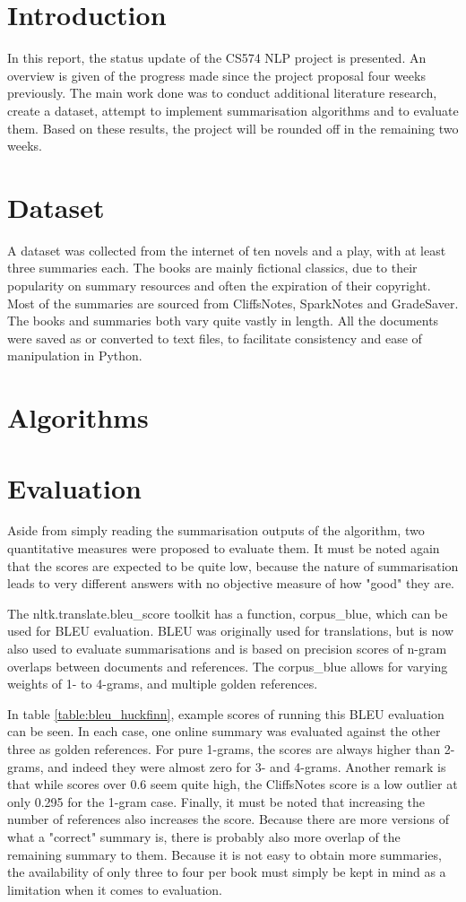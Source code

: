 \section{Introduction}
In this report, the status update of the CS574 NLP project is presented. An overview is given of the progress made since the project proposal four weeks previously. The main work done was to conduct additional literature research, create a dataset, attempt to implement summarisation algorithms and to evaluate them. Based on these results, the project will be rounded off in the remaining two weeks.

\section{Dataset}
A dataset was collected from the internet of ten novels and a play, with at least three summaries each. The books are mainly fictional classics, due to their popularity on summary resources and often the expiration of their copyright. Most of the summaries are sourced from CliffsNotes, SparkNotes and GradeSaver. The books and summaries both vary quite vastly in length. All the documents were saved as or converted to text files, to facilitate consistency and ease of manipulation in Python.

\section{Algorithms}

\section{Evaluation}
Aside from simply reading the summarisation outputs of the algorithm, two quantitative measures were proposed to evaluate them. It must be noted again that the scores are expected to be quite low, because the nature of summarisation leads to very different answers with no objective measure of how "good" they are. 

The nltk.translate.bleu\_score toolkit has a function, corpus\_blue, which can be used for BLEU evaluation. BLEU was originally used for translations, but is now also used to evaluate summarisations and is based on precision scores of n-gram overlaps between documents and references. The corpus\_blue allows for varying weights of 1- to 4-grams, and multiple golden references. 

In table \ref{table:bleu_huckfinn}, example scores of running this BLEU evaluation can be seen. In each case, one online summary was evaluated against the other three as golden references. For pure 1-grams, the scores are always higher than 2-grams, and indeed they were almost zero for 3- and 4-grams. Another remark is that while scores over 0.6 seem quite high, the CliffsNotes score is a low outlier at only 0.295 for the 1-gram case. Finally, it must be noted that increasing the number of references also increases the score. Because there are more versions of what a "correct" summary is, there is probably also more overlap of the remaining summary to them. Because it is not easy to obtain more summaries, the availability of only three to four per book must simply be kept in mind as a limitation when it comes to evaluation.

